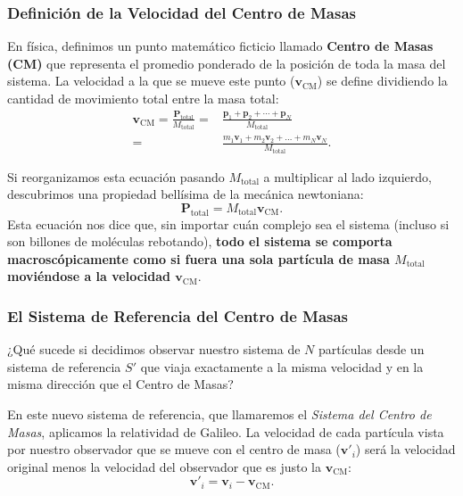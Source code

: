 \documentclass[11pt,a4paper]{book}
\begin{document}
\subsubsection{Definición de la Velocidad del Centro de Masas}

En física, definimos un punto matemático ficticio llamado \textbf{Centro de Masas (CM)} que representa el promedio ponderado de la posición de toda la masa del sistema. La velocidad a la que se mueve este punto ($\boldsymbol{v}_{\text{CM}}$) se define dividiendo la cantidad de movimiento total entre la masa total:
\begin{align}
    \boldsymbol{v}_{\text{CM}}=\frac{\boldsymbol{P}_{\text{total}}}{M_{\text{total}}} =  &
\frac{\boldsymbol{p}_1+\boldsymbol{p}_2+\cdots+\boldsymbol{p}_N}{M_{\text{total}}}
    \nonumber\\
    =&\frac{m_1\boldsymbol{v}_1 + m_2\boldsymbol{v}_2 + \dots + m_N\boldsymbol{v}_N}{M_{\text{total}}}.
\end{align}

Si reorganizamos esta ecuación pasando $M_{\text{total}}$ a multiplicar al lado izquierdo, descubrimos una propiedad bellísima de la mecánica newtoniana:
\begin{equation}
    \boldsymbol{P}_{\text{total}} = M_{\text{total}} \boldsymbol{v}_{\text{CM}}.
    \label{eq:momento_cm}
\end{equation}
Esta ecuación nos dice que, sin importar cuán complejo sea el sistema (incluso si son billones de moléculas rebotando), \textbf{todo el sistema se comporta macroscópicamente como si fuera una sola partícula de masa $M_{\text{total}}$ moviéndose a la velocidad $\boldsymbol{v}_{\text{CM}}$}.


\subsubsection{El Sistema de Referencia del Centro de Masas}

 ¿Qué sucede si decidimos observar nuestro sistema de $N$ partículas desde un sistema de referencia $S'$ que viaja exactamente a la misma velocidad y en la misma dirección que el Centro de Masas?

En este nuevo sistema de referencia, que llamaremos el \textit{Sistema del Centro de Masas}, aplicamos la relatividad de Galileo. La velocidad de cada partícula vista por nuestro observador que se mueve con el centro de masa ($\boldsymbol{v}'_i$) será la velocidad original menos la velocidad del observador que es justo la $\boldsymbol{v}_{\text{CM}}$:
\begin{equation}
    \boldsymbol{v}'_i = \boldsymbol{v}_i - \boldsymbol{v}_{\text{CM}}.
\end{equation}
\end{document}
